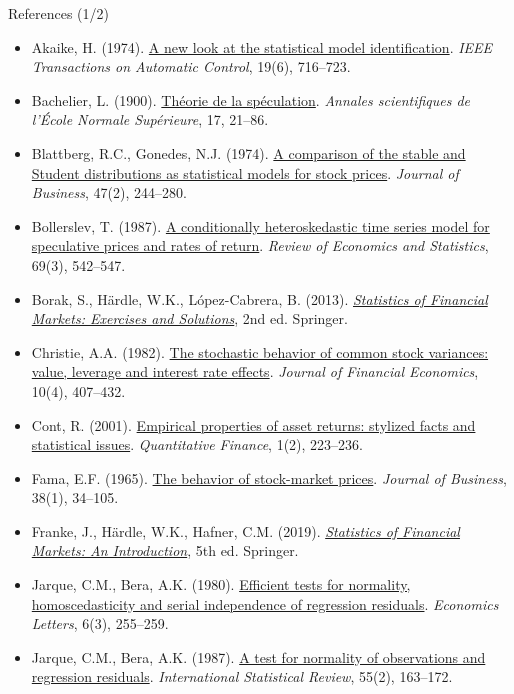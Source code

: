 \begin{frame}{References (1/2)}
\itemsize{\tiny}
\begin{itemize}
    \item Akaike, H. (1974). \href{https://doi.org/10.1109/TAC.1974.1100705}{A new look at the statistical model identification}. \textit{IEEE Transactions on Automatic Control}, 19(6), 716--723.
    \item Bachelier, L. (1900). \href{https://doi.org/10.24033/asens.476}{Théorie de la spéculation}. \textit{Annales scientifiques de l'École Normale Supérieure}, 17, 21--86.
    \item Blattberg, R.C., Gonedes, N.J. (1974). \href{https://doi.org/10.1086/295634}{A comparison of the stable and Student distributions as statistical models for stock prices}. \textit{Journal of Business}, 47(2), 244--280.
    \item Bollerslev, T. (1987). \href{https://doi.org/10.2307/1925546}{A conditionally heteroskedastic time series model for speculative prices and rates of return}. \textit{Review of Economics and Statistics}, 69(3), 542--547.
    \item Borak, S., Härdle, W.K., López-Cabrera, B. (2013). \href{https://doi.org/10.1007/978-3-642-33929-5}{\textit{Statistics of Financial Markets: Exercises and Solutions}}, 2nd ed. Springer.
    \item Christie, A.A. (1982). \href{https://doi.org/10.1016/0304-405X(82)90018-6}{The stochastic behavior of common stock variances: value, leverage and interest rate effects}. \textit{Journal of Financial Economics}, 10(4), 407--432.
    \item Cont, R. (2001). \href{https://doi.org/10.1080/713665670}{Empirical properties of asset returns: stylized facts and statistical issues}. \textit{Quantitative Finance}, 1(2), 223--236.
    \item Fama, E.F. (1965). \href{https://doi.org/10.1086/294743}{The behavior of stock-market prices}. \textit{Journal of Business}, 38(1), 34--105.
    \item Franke, J., Härdle, W.K., Hafner, C.M. (2019). \href{https://doi.org/10.1007/978-3-030-13751-9}{\textit{Statistics of Financial Markets: An Introduction}}, 5th ed. Springer.
    \item Jarque, C.M., Bera, A.K. (1980). \href{https://doi.org/10.1016/0165-1765(80)90024-5}{Efficient tests for normality, homoscedasticity and serial independence of regression residuals}. \textit{Economics Letters}, 6(3), 255--259.
    \item Jarque, C.M., Bera, A.K. (1987). \href{https://doi.org/10.2307/1403192}{A test for normality of observations and regression residuals}. \textit{International Statistical Review}, 55(2), 163--172.
\end{itemize}
\end{frame}

